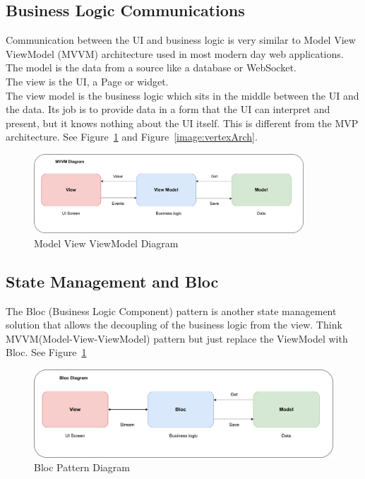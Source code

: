 \subsection{Business Logic Communications}
Communication between the UI and business logic is very similar to Model View ViewModel (MVVM) architecture used in most modern day web applications.
\\ The model is the data from a source like a database or WebSocket.
\\ The view is the UI, a Page or widget.
\\ The view model is the business logic which sits in the middle between the UI and the data. Its job is to provide data in a form that the UI can interpret and present, but it knows nothing about the UI itself. This is different from the MVP architecture.
See Figure~\ref{image:mvvmDiagram} and Figure~\ref{image:vertexArch}.

\begin{figure}[h!]
    \caption{Model View ViewModel Diagram}
    \label{image:mvvmDiagram}
    \centering
    \includegraphics[width=0.9\textwidth]{images/mvvm_diagram.png}
\end{figure}

\subsection{State Management and Bloc}
The Bloc (Business Logic Component) pattern is another state management solution that allows the decoupling of the business logic from the view. Think MVVM(Model-View-ViewModel) pattern but just replace the ViewModel with Bloc. 
See Figure~\ref{image:mvvmDiagram}

\begin{figure}[h!]
    \caption{Bloc Pattern Diagram}
    \label{image:blocPattern}
    \centering
    \includegraphics[width=1.0\textwidth]{images/Bloc_diagram.png}
\end{figure}

